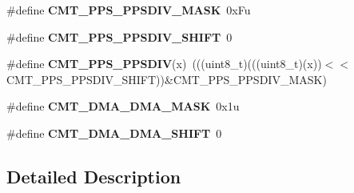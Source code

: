 \begin{DoxyCompactItemize}
\item 
\#define {\bfseries C\+M\+T\+\_\+\+P\+P\+S\+\_\+\+P\+P\+S\+D\+I\+V\+\_\+\+M\+A\+SK}~0x\+Fu\hypertarget{group__CMT__Register__Masks_ga52042920cc25a46d0e050801a105a629}{}\label{group__CMT__Register__Masks_ga52042920cc25a46d0e050801a105a629}

\item 
\#define {\bfseries C\+M\+T\+\_\+\+P\+P\+S\+\_\+\+P\+P\+S\+D\+I\+V\+\_\+\+S\+H\+I\+FT}~0\hypertarget{group__CMT__Register__Masks_gaaafd6c1e8178ed7cd283f3ffcfaed535}{}\label{group__CMT__Register__Masks_gaaafd6c1e8178ed7cd283f3ffcfaed535}

\item 
\#define {\bfseries C\+M\+T\+\_\+\+P\+P\+S\+\_\+\+P\+P\+S\+D\+IV}(x)~(((uint8\+\_\+t)(((uint8\+\_\+t)(x))$<$$<$C\+M\+T\+\_\+\+P\+P\+S\+\_\+\+P\+P\+S\+D\+I\+V\+\_\+\+S\+H\+I\+FT))\&C\+M\+T\+\_\+\+P\+P\+S\+\_\+\+P\+P\+S\+D\+I\+V\+\_\+\+M\+A\+SK)\hypertarget{group__CMT__Register__Masks_ga47d0c8720fa9b402dbacf8e53eec5134}{}\label{group__CMT__Register__Masks_ga47d0c8720fa9b402dbacf8e53eec5134}

\item 
\#define {\bfseries C\+M\+T\+\_\+\+D\+M\+A\+\_\+\+D\+M\+A\+\_\+\+M\+A\+SK}~0x1u\hypertarget{group__CMT__Register__Masks_ga65c04dcbc5d319c8f0532568570e555a}{}\label{group__CMT__Register__Masks_ga65c04dcbc5d319c8f0532568570e555a}

\item 
\#define {\bfseries C\+M\+T\+\_\+\+D\+M\+A\+\_\+\+D\+M\+A\+\_\+\+S\+H\+I\+FT}~0\hypertarget{group__CMT__Register__Masks_gaf60148184935a9ae825cecc482734b31}{}\label{group__CMT__Register__Masks_gaf60148184935a9ae825cecc482734b31}

\end{DoxyCompactItemize}


\subsection{Detailed Description}
